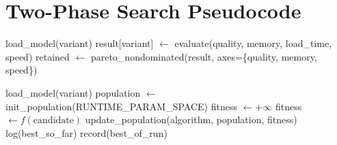 \documentclass[journal]{IEEEtran}
\begin{document}
\section{Two-Phase Search Pseudocode}

\begin{algorithm}
\caption{Phase 1 --- Exhaustive quantization sweep}
\begin{algorithmic}[1]
  \State load\_model(variant)
  \State result[variant] $\leftarrow$ evaluate(quality, memory, load\_time, speed)
\EndFor
\State retained $\leftarrow$ pareto\_nondominated(result, axes=\{quality, memory, speed\})
\end{algorithmic}
\end{algorithm}

\begin{algorithm}
\caption{Phase 2 --- Metaheuristic runtime search (per retained variant)}
\begin{algorithmic}[1]
  \State load\_model(variant) 
      \State population $\leftarrow$ init\_population(RUNTIME\_PARAM\_SPACE)
           
            \State fitness $\leftarrow +\infty$ 
          \Else
            \State fitness $\leftarrow f(\text{candidate})$ 
          \EndIf
        \EndFor
        \State update\_population(algorithm, population, fitness)
        \State log(best\_so\_far)
      \EndFor
      \State record(best\_of\_run)
    \EndFor
  \EndFor
\EndFor
\end{algorithmic}
\end{algorithm}
\end{document}
